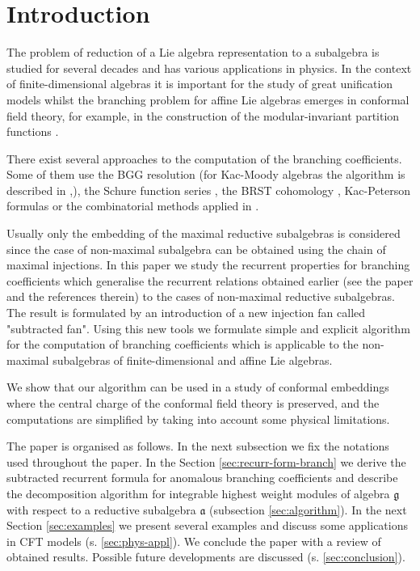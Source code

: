 \documentclass[a4paper,12pt]{article}
\theoremstyle{definition} \newtheorem{Def}{Definition}
\begin{document}
\section{Introduction}
\label{sec:introduction}

The problem of reduction of a Lie algebra representation to a  subalgebra is studied for several decades and has various applications in physics. In the context of finite-dimensional algebras it is important for the study of great unification models whilst the branching problem for affine Lie algebras emerges in conformal field theory, for example, in the construction of the modular-invariant partition functions \cite{difrancesco1997cft}.

There exist several approaches to the computation of the branching coefficients. Some of them use the BGG
resolution \cite{bernstein1975differential} (for Kac-Moody algebras the algorithm is described in
\cite{kac1990idl},\cite{wakimoto2001idl}), the Schure function series \cite{fauser2006new}, the BRST
cohomology \cite{hwang1994general}, Kac-Peterson formulas \cite{kac1990idl,quella2002branching} or the
combinatorial methods applied in \cite{feigin707principal}.

Usually only the embedding of the maximal reductive subalgebras is considered since the case of non-maximal subalgebra can be obtained using the chain of maximal injections. In this paper we study the recurrent properties for branching coefficients which generalise the recurrent relations obtained earlier (see the paper \cite{ilyin812pbc}and the references therein) to the cases of non-maximal reductive subalgebras. The result is formulated by an introduction of a new injection fan called "subtracted fan". Using this new tools we formulate simple and explicit algorithm for the computation of branching coefficients which is applicable to the non-maximal subalgebras of finite-dimensional and affine Lie algebras.

We show that our algorithm can be used in a study of conformal embeddings where the central charge of the conformal field theory is preserved, and the computations are simplified by taking into account some  physical limitations.

The paper is organised as follows. In the next subsection  we fix the notations used throughout the paper. In the Section \ref{sec:recurr-form-branch} we derive the subtracted recurrent formula for anomalous branching coefficients and describe the decomposition algorithm for integrable highest weight modules of algebra $\mathfrak{g}$ with respect to a reductive subalgebra $\mathfrak{a}$ (subsection \ref{sec:algorithm}). In the next Section \ref{sec:examples} we present several examples and discuss some applications in CFT models (s. \ref{sec:phys-appl}). We conclude the paper with a review of obtained results. Possible future developments are discussed (s. \ref{sec:conclusion}).
\end{document}
